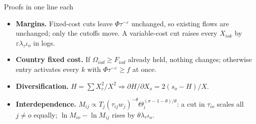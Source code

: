 \documentclass[notes,11pt, aspectratio=169]{beamer}
\begin{document}
\begin{frame}{Proofs in one line each}
\small
\begin{itemize}\setlength{\itemsep}{6pt}
\item \textbf{Margins.} Fixed-cost cuts leave $\Phi\tau^{-\varepsilon}$ unchanged, so existing flows are unchanged; only the cutoffs move. A variable-cost cut raises every $X_{iok}$ by $\varepsilon\lambda_\tau\iota_o$ in logs.
\item \textbf{Country fixed cost.} If $\Omega_{iod}\ge F_{iod}$ already held, nothing changes; otherwise entry activates every $k$ with $\Phi\tau^{-\varepsilon}\ge f$ at once.
\item \textbf{Diversification.} $H=\sum X_c^2/X^2\Rightarrow\partial H/\partial X_o=2(s_o-H)/X$.
\item \textbf{Interdependence.} $M_{ij}\propto T_j(\tau_{ij}w_j)^{-\theta}\Theta_i^{(\sigma-1-\theta)/\theta}$: a cut in $\tau_{io}$ scales all $j\neq o$ equally; $\ln M_{io}-\ln M_{ij}$ rises by $\theta\lambda_\tau\iota_o$.
\end{itemize}
\end{frame}
\end{document}
